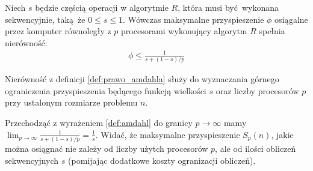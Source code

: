 \begin{definicja}\label{def:prawo_amdahla}
Niech \(s\) będzie częścią operacji w algorytmie \(R\), która musi być wykonana sekwencyjnie, taką że \(0\leq s \leq 1\). Wówczas maksymalne przyspieszenie \(\phi\) osiągalne przez komputer równoległy z \(p\) procesorami wykonujący algorytm \(R\) spełnia nierówność:
\begin{align}
\phi \leq \frac{1}{s+(1-s)/p}
\end{align}
\end{definicja}
\begin{uwaga}
Nierówność z definicji \ref{def:prawo_amdahla} służy do wyznaczania górnego ograniczenia przyspieszenia będącego funkcją wielkości \(s\) oraz liczby procesorów \(p\) przy ustalonym rozmiarze problemu \(n\).
\end{uwaga}
\begin{wniosek}
Przechodząć z wyrażeniem \eqref{def:amdahl} do granicy \(p\to\infty\) mamy \(\lim_{p\to\infty} \frac{1}{s+(1-s)/p} = \frac{1}{s}\). Widać, że maksymalne przyspieszenie \(S_{p}(n)\), jakie można osiągnać nie zależy od liczby użytch procesorów \(p\), ale od ilości obliczeń sekwencyjnych \(s\) (pomijając dodatkowe koszty ogranizacji obliczeń).
\end{wniosek}

